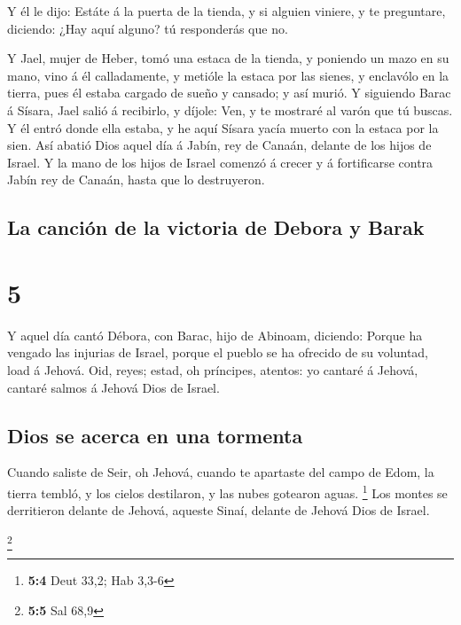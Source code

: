  Y él le dijo: Estáte á la puerta de la tienda, y si
alguien viniere, y te preguntare, diciendo: ¿Hay aquí alguno? tú
responderás que no.

 Y Jael, mujer de Heber, tomó una estaca de la tienda, y
poniendo un mazo en su mano, vino á él calladamente, y metióle la estaca
por las sienes, y enclavólo en la tierra, pues él estaba cargado de
sueño y cansado; y así murió.  Y siguiendo Barac á Sísara,
Jael salió á recibirlo, y díjole: Ven, y te mostraré al varón que tú
buscas. Y él entró donde ella estaba, y he aquí Sísara yacía muerto con
la estaca por la sien.  Así abatió Dios aquel día á Jabín,
rey de Canaán, delante de los hijos de Israel.  Y la mano
de los hijos de Israel comenzó á crecer y á fortificarse contra Jabín
rey de Canaán, hasta que lo destruyeron.

\hypertarget{la-canciuxf3n-de-la-victoria-de-debora-y-barak}{%
\subsection{La canción de la victoria de Debora y
Barak}\label{la-canciuxf3n-de-la-victoria-de-debora-y-barak}}

\hypertarget{section-4}{%
\section{5}\label{section-4}}

 Y aquel día cantó Débora, con Barac, hijo de Abinoam,
diciendo:  Porque ha vengado las injurias de Israel, porque
el pueblo se ha ofrecido de su voluntad, load á Jehová. 
Oid, reyes; estad, oh príncipes, atentos: yo cantaré á Jehová, cantaré
salmos á Jehová Dios de Israel.

\hypertarget{dios-se-acerca-en-una-tormenta}{%
\subsection{Dios se acerca en una
tormenta}\label{dios-se-acerca-en-una-tormenta}}

 Cuando saliste de Seir, oh Jehová, cuando te apartaste del
campo de Edom, la tierra tembló, y los cielos destilaron, y las nubes
gotearon aguas. \footnote{\textbf{5:4} Deut 33,2; Hab 3,3-6}
 Los montes se derritieron delante de Jehová, aqueste Sinaí,
delante de Jehová Dios de Israel.

\footnote{\textbf{5:5} Sal 68,9}

